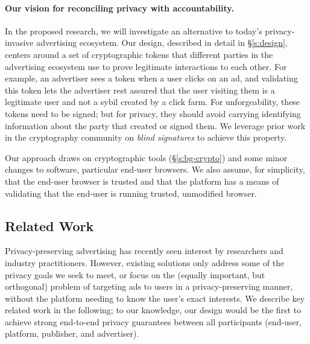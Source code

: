 \paragraph{Our vision for reconciling privacy with accountability.}
%
In the proposed research, we will investigate an alternative to today's privacy-invasive
advertising ecosystem.
%
Our design, described in detail in \S\ref{s:design}, centers around a set of cryptographic tokens that different parties in the advertising ecosystem use to prove legitimate interactions to each other.
%
For example, an advertiser sees a token when a user clicks on an ad, and validating this token lets the advertiser rest assured that the user visiting them is a legitimate user and not a sybil created by a click farm.
%
For unforgeability, these tokens need to be signed; but for privacy, they should avoid carrying identifying information about the party that created or signed them.
%
We leverage prior work in the cryptography community on \emph{blind signatures} to achieve this property.
%

%
Our approach draws on cryptographic tools (\S\ref{s:bg-crypto}) and some minor changes to software, particular end-user browsers.
%
We also assume, for simplicity, that the end-user browser is trusted and that the platform has a means of validating that the end-user is running trusted, unmodified browser.
%

%
%
%


\subsection{Related Work}
\label{s:bg-related}
%
Privacy-preserving advertising has recently seen interest by researchers and industry practitioners.
%
However, existing solutions only address some of the privacy goals we seek to meet, or focus on the (equally important, but orthogonal) problem of targeting ads to users in a privacy-preserving manner, \ie without the platform needing to know the user's exact interests.
%
We describe key related work in the following; to our knowledge, our design would be the first to achieve strong end-to-end privacy guarantees between all participants (end-user, platform, publisher, and advertiser).
%

